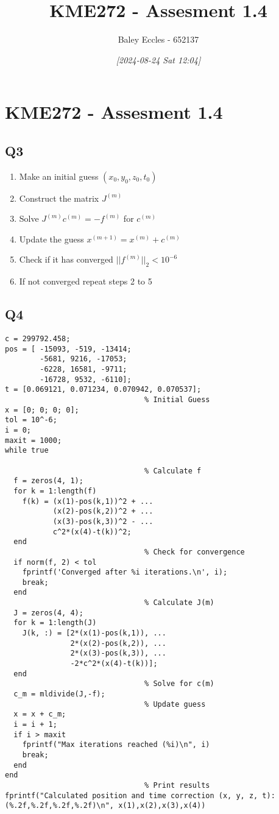 \documentclass[11pt]{article}
\author{Baley Eccles - 652137}
\date{\textit{{[}2024-08-24 Sat 12:04]}}
\title{KME272 - Assesment 1.4}
\begin{document}
\maketitle
\tableofcontents

\section{KME272 - Assesment 1.4}
\label{sec:orgb8ce55f}
\subsection{Q3}
\label{sec:orgc837f5b}

\begin{enumerate}
\item Make an initial guess \((x_0,y_0,z_0,t_0)\)
\item Construct the matrix \(J^{(m)}\)
\item Solve \(J^{(m)}c^{(m)}=-f^{(m)}\) for \(c^{(m)}\)
\item Update the guess \(x^{(m+1)}=x^{(m)}+c^{(m)}\)
\item Check if it has converged \(\lvert \lvert f^{(m)}\rvert \rvert_{2} < 10^{-6}\)
\item If not converged repeat steps 2 to 5
\end{enumerate}
\subsection{Q4}
\label{sec:org37f311a}


\begin{verbatim}
c = 299792.458;
pos = [ -15093, -519, -13414;
        -5681, 9216, -17053;
        -6228, 16581, -9711;
        -16728, 9532, -6110];
t = [0.069121, 0.071234, 0.070942, 0.070537];
                                % Initial Guess
x = [0; 0; 0; 0];
tol = 10^-6;
i = 0;
maxit = 1000;
while true

                                % Calculate f
  f = zeros(4, 1);
  for k = 1:length(f)
    f(k) = (x(1)-pos(k,1))^2 + ...
           (x(2)-pos(k,2))^2 + ...
           (x(3)-pos(k,3))^2 - ...
           c^2*(x(4)-t(k))^2;
  end
                                % Check for convergence
  if norm(f, 2) < tol
    fprintf('Converged after %i iterations.\n', i);
    break;
  end
                                % Calculate J(m)
  J = zeros(4, 4);
  for k = 1:length(J)
    J(k, :) = [2*(x(1)-pos(k,1)), ...
               2*(x(2)-pos(k,2)), ...
               2*(x(3)-pos(k,3)), ...
               -2*c^2*(x(4)-t(k))];
  end
                                % Solve for c(m)
  c_m = mldivide(J,-f);
                                % Update guess
  x = x + c_m;
  i = i + 1;
  if i > maxit
    fprintf("Max iterations reached (%i)\n", i)
    break;
  end
end
                                % Print results
fprintf("Calculated position and time correction (x, y, z, t): (%.2f,%.2f,%.2f,%.2f)\n", x(1),x(2),x(3),x(4))
\end{verbatim}
\end{document}
